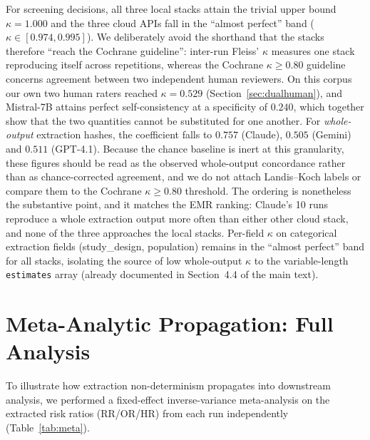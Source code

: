 \documentclass[11pt]{article}
\begin{document}
\noindent For screening decisions, all three local stacks attain the trivial upper bound $\kappa{=}1.000$ and the three cloud APIs fall in the ``almost perfect'' band ($\kappa{\in}[0.974, 0.995]$). We deliberately avoid the shorthand that the stacks therefore ``reach the Cochrane guideline'': inter-run Fleiss' $\kappa$ measures one stack reproducing itself across repetitions, whereas the Cochrane $\kappa{\geq}0.80$ guideline concerns agreement between two independent human reviewers. On this corpus our own two human raters reached $\kappa{=}0.529$ (Section~\ref{sec:dualhuman}), and Mistral-7B attains perfect self-consistency at a specificity of $0.240$, which together show that the two quantities cannot be substituted for one another.
For \emph{whole-output} extraction hashes, the coefficient falls to $0.757$ (Claude), $0.505$ (Gemini) and $0.511$ (GPT-4.1). Because the chance baseline is inert at this granularity, these figures should be read as the observed whole-output concordance rather than as chance-corrected agreement, and we do not attach Landis--Koch labels or compare them to the Cochrane $\kappa{\geq}0.80$ threshold. The ordering is nonetheless the substantive point, and it matches the EMR ranking: Claude's 10 runs reproduce a whole extraction output more often than either other cloud stack, and none of the three approaches the local stacks. Per-field $\kappa$ on categorical extraction fields (study\_design, population) remains in the ``almost perfect'' band for all stacks, isolating the source of low whole-output $\kappa$ to the variable-length \texttt{estimates} array (already documented in Section~4.4 of the main text).

\section{Meta-Analytic Propagation: Full Analysis}
\label{sec:metaprop_supp}

To illustrate how extraction non-determinism propagates into downstream analysis, we performed a fixed-effect inverse-variance meta-analysis on the extracted risk ratios (RR/OR/HR) from each run independently (Table~\ref{tab:meta}).
\end{document}

